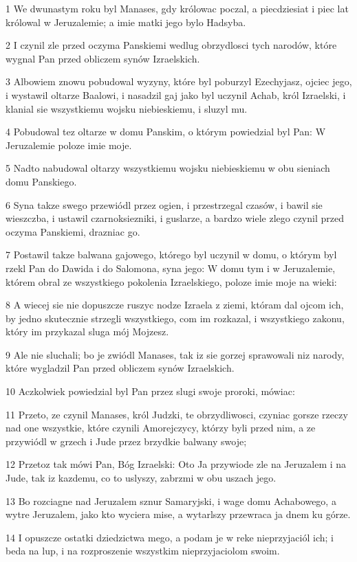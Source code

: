 \par 1 We dwunastym roku byl Manases, gdy królowac poczal, a piecdziesiat i piec lat królowal w Jeruzalemie; a imie matki jego bylo Hadsyba.
\par 2 I czynil zle przed oczyma Panskiemi wedlug obrzydlosci tych narodów, które wygnal Pan przed obliczem synów Izraelskich.
\par 3 Albowiem znowu pobudowal wyzyny, które byl poburzyl Ezechyjasz, ojciec jego, i wystawil oltarze Baalowi, i nasadzil gaj jako byl uczynil Achab, król Izraelski, i klanial sie wszystkiemu wojsku niebieskiemu, i sluzyl mu.
\par 4 Pobudowal tez oltarze w domu Panskim, o którym powiedzial byl Pan: W Jeruzalemie poloze imie moje.
\par 5 Nadto nabudowal oltarzy wszystkiemu wojsku niebieskiemu w obu sieniach domu Panskiego.
\par 6 Syna takze swego przewiódl przez ogien, i przestrzegal czasów, i bawil sie wieszczba, i ustawil czarnoksiezniki, i guslarze, a bardzo wiele zlego czynil przed oczyma Panskiemi, drazniac go.
\par 7 Postawil takze balwana gajowego, którego byl uczynil w domu, o którym byl rzekl Pan do Dawida i do Salomona, syna jego: W domu tym i w Jeruzalemie, którem obral ze wszystkiego pokolenia Izraelskiego, poloze imie moje na wieki:
\par 8 A wiecej sie nie dopuszcze ruszyc nodze Izraela z ziemi, któram dal ojcom ich, by jedno skutecznie strzegli wszystkiego, com im rozkazal, i wszystkiego zakonu, który im przykazal sluga mój Mojzesz.
\par 9 Ale nie sluchali; bo je zwiódl Manases, tak iz sie gorzej sprawowali niz narody, które wygladzil Pan przed obliczem synów Izraelskich.
\par 10 Aczkolwiek powiedzial byl Pan przez slugi swoje proroki, mówiac:
\par 11 Przeto, ze czynil Manases, król Judzki, te obrzydliwosci, czyniac gorsze rzeczy nad one wszystkie, które czynili Amorejczycy, którzy byli przed nim, a ze przywiódl w grzech i Jude przez brzydkie balwany swoje;
\par 12 Przetoz tak mówi Pan, Bóg Izraelski: Oto Ja przywiode zle na Jeruzalem i na Jude, tak iz kazdemu, co to uslyszy, zabrzmi w obu uszach jego.
\par 13 Bo rozciagne nad Jeruzalem sznur Samaryjski, i wage domu Achabowego, a wytre Jeruzalem, jako kto wyciera mise, a wytarlszy przewraca ja dnem ku górze.
\par 14 I opuszcze ostatki dziedzictwa mego, a podam je w reke nieprzyjaciól ich; i beda na lup, i na rozproszenie wszystkim nieprzyjaciolom swoim.
